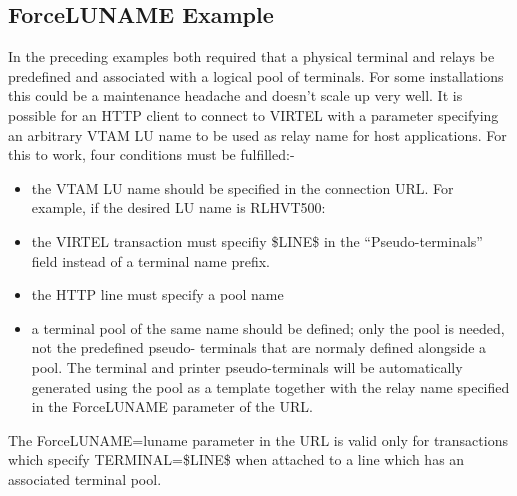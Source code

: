 \documentclass[letterpaper,10pt,english]{sphinxmanual}
\begin{document}
\subsection{ForceLUNAME Example}
\label{\detokenize{connectivity_guide:forceluname-example}}\label{\detokenize{connectivity_guide:index-152}}
In the preceding examples both required that a physical terminal and relays be predefined and associated with a logical pool of terminals. For some installations this could be a maintenance headache and doesn’t scale up very well. It is possible for an HTTP client to connect to VIRTEL with a parameter specifying an arbitrary VTAM LU name to be used as relay name for host applications. For this to work, four conditions must be fulfilled:-
\begin{itemize}
\item {} 
the VTAM LU name should be specified in the connection URL. For example, if the desired LU name is RLHVT500:

\end{itemize}

\begin{sphinxVerbatim}[commandchars=\\\{\}]
\end{sphinxVerbatim}
\begin{itemize}
\item {} 
the VIRTEL transaction must specifiy \$LINE\$ in the “Pseudo-terminals” field instead of a terminal name prefix.

\item {} 
the HTTP line must specify a pool name

\item {} 
a terminal pool of the same name should be defined; only the pool is needed, not the predefined pseudo- terminals that are normaly defined alongside a pool. The terminal and printer pseudo-terminals will be automatically generated using the pool as a template together with the relay name specified in the ForceLUNAME parameter of the URL.

\end{itemize}

The ForceLUNAME=luname parameter in the URL is valid only for transactions which specify TERMINAL=\$LINE\$ when attached to a line which has an associated terminal pool.
\end{document}
